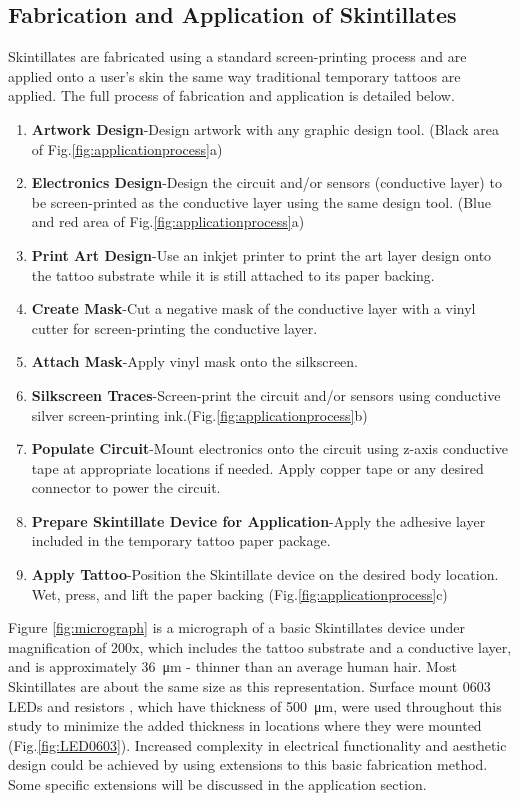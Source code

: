 \documentclass{sigchi}
\begin{document}
\subsection{Fabrication and Application of Skintillates}
Skintillates are fabricated using a standard screen-printing process and are applied onto a user's skin the same way traditional temporary tattoos are applied. The full process of fabrication and application is detailed below.
\begin{enumerate}
  \item \textbf{Artwork Design}-Design artwork with any graphic design tool. (Black area of Fig.\ref{fig:applicationprocess}a)
  \item \textbf{Electronics Design}-Design the circuit and/or sensors (conductive layer) to be screen-printed as the conductive layer using the same design tool. (Blue and red area  of Fig.\ref{fig:applicationprocess}a) 
  \item \textbf{Print Art Design}-Use an inkjet printer to print the art layer design onto the tattoo substrate while it is still attached to its paper backing. 
  \item \textbf{Create Mask}-Cut a negative mask of the conductive layer with a vinyl cutter for screen-printing the conductive layer.
  \item \textbf{Attach Mask}-Apply vinyl mask onto the silkscreen.
  \item \textbf{Silkscreen Traces}-Screen-print the circuit and/or sensors using conductive silver screen-printing ink.(Fig.\ref{fig:applicationprocess}b) 
  \item \textbf{Populate Circuit}-Mount electronics onto the circuit using z-axis conductive tape at appropriate locations if needed. Apply copper tape or any desired connector to power the circuit. 
  \item \textbf{Prepare Skintillate Device for Application}-Apply the adhesive layer included in the temporary tattoo paper package.
  \item \textbf{Apply Tattoo}-Position the Skintillate device on the desired body location. Wet, press, and lift the paper backing (Fig.\ref{fig:applicationprocess}c) 
\end{enumerate}
Figure \ref{fig:micrograph} is a micrograph of a basic Skintillates device under magnification of 200x, which includes the tattoo substrate and a conductive layer, and is approximately 36\SI{}{\micro\metre} - thinner than an average human hair.  Most Skintillates are about the same size as this representation. Surface mount 0603 LEDs and resistors%
, which have thickness of  \SI{500}{\micro\metre}, were used throughout this study to minimize the added thickness in locations where they were mounted (Fig.\ref{fig:LED0603}). Increased complexity in electrical functionality and aesthetic design could be achieved by using extensions to this basic fabrication method. Some specific extensions will be discussed in the application section. 
\end{document}
